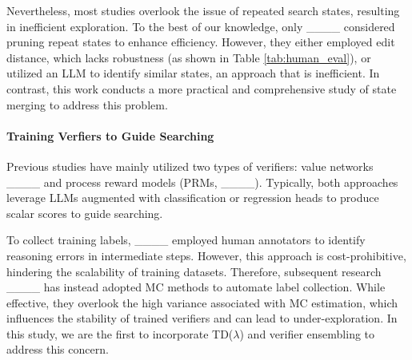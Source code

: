 Nevertheless, most studies overlook the issue of repeated search states, resulting in inefficient exploration.
To the best of our knowledge, only ____ considered pruning repeat states to enhance efficiency.
However, they either employed edit distance, which lacks robustness (as shown in Table \ref{tab:human_eval}), or utilized an LLM to identify similar states, an approach that is inefficient.
In contrast, this work conducts a more practical and comprehensive study of state merging to address this problem.

\fi

\paragraph{Training Verfiers to Guide Searching}
Previous studies have mainly utilized two types of verifiers: value networks ____ and process reward models (PRMs, ____).
Typically, both approaches leverage LLMs augmented with classification or regression heads to produce scalar scores to guide searching.

To collect training labels, ____ employed human annotators to identify reasoning errors in intermediate steps.
However, this approach is cost-prohibitive, hindering the scalability of training datasets.
Therefore, subsequent research ____ has instead adopted MC methods to automate label collection.
While effective, they overlook the high variance associated with MC estimation, which influences the stability of trained verifiers and can lead to under-exploration.
In this study, we are the first to incorporate TD($\lambda$) and verifier ensembling to address this concern.

